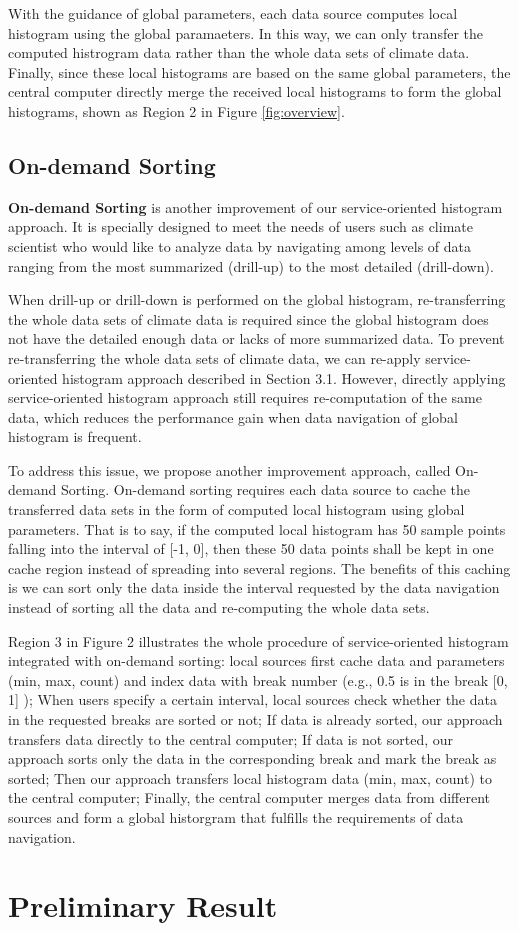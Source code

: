 \documentclass[times, 10pt,onecolumn]{article} %
\begin{document}
With the guidance of global parameters, each data source computes local histogram using the global paramaeters. In this way, we can only transfer the computed histrogram data rather than the whole data sets of climate data. Finally, since these local histograms are based on the same global parameters, the central computer directly merge the received local histograms to form the global histograms, shown as Region 2 in Figure \ref{fig:overview}.


\subsection{On-demand Sorting}
\textbf{On-demand Sorting} is another improvement of our service-oriented histogram approach. It is specially designed to meet the needs of users such as climate scientist who would like to analyze data by navigating among levels of data ranging from the most summarized (drill-up) to the most detailed (drill-down). 

When drill-up or drill-down is performed on the global histogram, re-transferring the whole data sets of climate data is required since the global histogram does not have the detailed enough data or lacks of more summarized data. To prevent re-transferring the whole data sets of climate data, we can re-apply service-oriented histogram approach described in Section 3.1. However, directly applying service-oriented histogram approach still requires re-computation of the same data, which reduces the performance gain when data navigation of global histogram is frequent.

To address this issue, we propose another improvement approach, called On-demand Sorting. On-demand sorting requires each data source to cache the transferred data sets in the form of computed local histogram using global parameters. That is to say, if the computed local histogram has 50 sample points falling into the interval of [-1, 0], then these 50 data points shall be kept in one cache region instead of spreading into several regions. The benefits of this caching is we can sort only the data inside the interval requested by the data navigation instead of sorting all the data and re-computing the whole data sets.  

Region 3 in Figure 2 illustrates the whole procedure of service-oriented histogram integrated with on-demand sorting: local sources first cache data and parameters (min, max, count) and index data with break number (e.g., 0.5 is in the break [0, 1] ); When users specify a certain interval, local sources check whether the data in the requested breaks are sorted or not; If data is already sorted, our approach transfers data directly to the central computer; If data is not sorted, our approach sorts only the data in the corresponding break and mark the break as sorted; Then our approach transfers local histogram data (min, max, count) to the central computer; Finally, the central computer merges data from different sources and form a global historgram that fulfills the requirements of data navigation.


\section{Preliminary Result}


\end{document}
